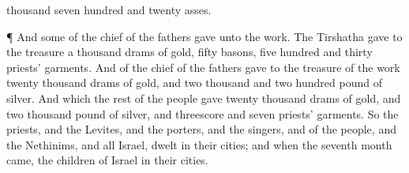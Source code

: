 {thousand
seven
hundred and
twenty
asses.
\par }{\PP {}¶ And some
of the
chief of the
fathers
gave unto the
work. The
Tirshatha
gave to the
treasure a
thousand
drams of
gold,
fifty
basons,
five
hundred and
thirty
priests’
garments.
And
{} of the
chief of the
fathers
gave to the
treasure of the
work
twenty
thousand
drams of
gold, and two
thousand and two
hundred
pound of
silver.
And
{} which the
rest of the
people
gave
{}
twenty
thousand
drams of
gold, and two
thousand
pound of
silver, and
threescore and
seven
priests’
garments.
So the
priests, and the
Levites, and the
porters, and the
singers, and
{} of the
people, and the
Nethinims, and all
Israel,
dwelt in their
cities; and when the
seventh
month
came, the
children of
Israel
{} in their
cities.

}
